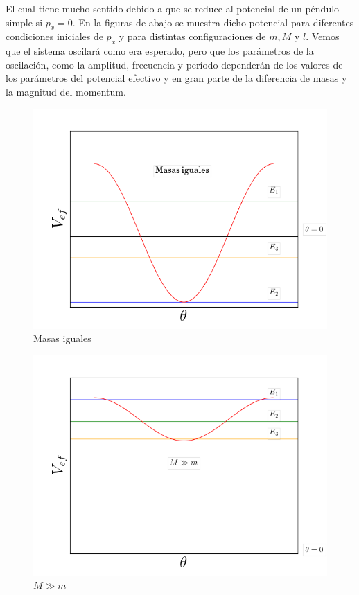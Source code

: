 \documentclass[a4paper,10pt]{article}
\numberwithin{equation}{section}
\begin{document}
El cual tiene mucho sentido debido a que se reduce al potencial de un péndulo simple 
si $p_x = 0$. En la figuras de abajo se muestra dicho potencial para diferentes condiciones 
iniciales de $p_x$ y para distintas configuraciones de $m, M$ y $l$. Vemos que el sistema 
oscilará como era esperado, pero que los parámetros de la oscilación, como la amplitud,
frecuencia y período dependerán de los valores de los parámetros del potencial efectivo 
y en gran parte de la diferencia de masas y la magnitud del momentum.

\begin{figure}[H]
 \center
 \includegraphics[scale=0.5]{problema3fig2}
 \caption{Masas iguales}
 \label{fig:problema3fig2}
\end{figure}


\begin{figure}[H]
 \center
 \includegraphics[scale=0.5]{problema3fig3}
 \caption{$M \gg m$}
 \label{fig:problema3fig3}
\end{figure}
\end{document}
